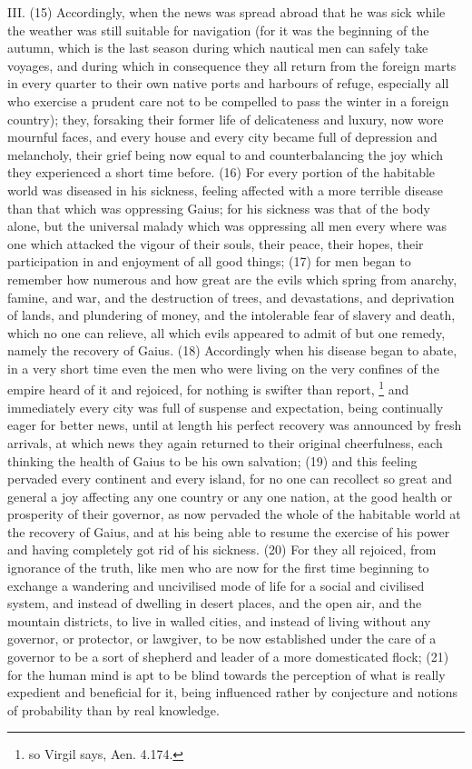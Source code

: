 III. (15) Accordingly, when the news was spread abroad that he was sick while the weather was still
suitable for navigation (for it was the beginning of the autumn, which is the last season during which
nautical men can safely take voyages, and during which in consequence they all return from the
foreign marts in every quarter to their own native ports and harbours of refuge, especially all who
exercise a prudent care not to be compelled to pass the winter in a foreign country); they,
forsaking their former life of delicateness and luxury, now wore mournful faces, and every house
and every city became full of depression and melancholy, their grief being now equal to and
counterbalancing the joy which they experienced a short time before. (16) For every portion of the
habitable world was diseased in his sickness, feeling affected with a more terrible disease than
that which was oppressing Gaius; for his sickness was that of the body alone, but the universal
malady which was oppressing all men every where was one which attacked the vigour of their
souls, their peace, their hopes, their participation in and enjoyment of all good things; (17) for men
began to remember how numerous and how great are the evils which spring from anarchy, famine,
and war, and the destruction of trees, and devastations, and deprivation of lands, and plundering of
money, and the intolerable fear of slavery and death, which no one can relieve, all which evils
appeared to admit of but one remedy, namely the recovery of Gaius. (18) Accordingly when his
disease began to abate, in a very short time even the men who were living on the very confines of
the empire heard of it and rejoiced, for nothing is swifter than report, \footnote{so Virgil says, Aen. 4.174.} and
immediately every city was full of suspense and expectation, being continually eager for better
news, until at length his perfect recovery was announced by fresh arrivals, at which news they
again returned to their original cheerfulness, each thinking the health of Gaius to be his own
salvation; (19) and this feeling pervaded every continent and every island, for no one can recollect
so great and general a joy affecting any one country or any one nation, at the good health or
prosperity of their governor, as now pervaded the whole of the habitable world at the recovery of
Gaius, and at his being able to resume the exercise of his power and having completely got rid of
his sickness. (20) For they all rejoiced, from ignorance of the truth, like men who are now for the
first time beginning to exchange a wandering and uncivilised mode of life for a social and civilised
system, and instead of dwelling in desert places, and the open air, and the mountain districts, to
live in walled cities, and instead of living without any governor, or protector, or lawgiver, to be now
established under the care of a governor to be a sort of shepherd and leader of a more
domesticated flock; (21) for the human mind is apt to be blind towards the perception of what is
really expedient and beneficial for it, being influenced rather by conjecture and notions of
probability than by real knowledge.

